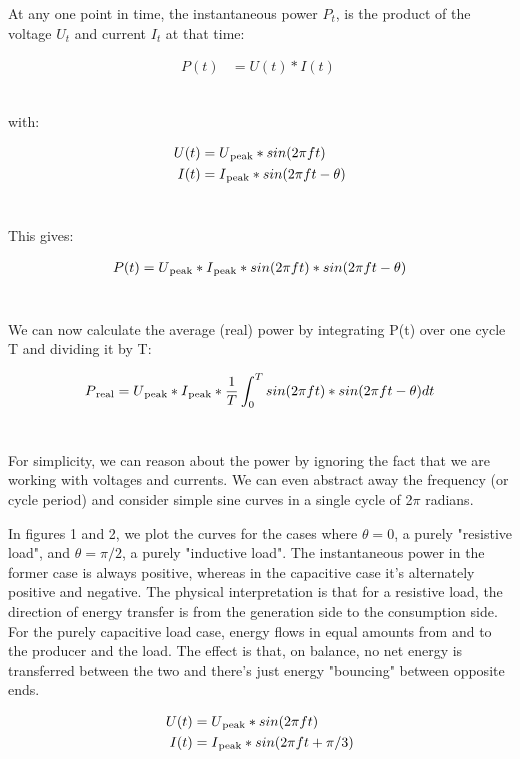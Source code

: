 \documentclass[a4paper]{article}
\def\SB#1{\textsubscript{{#1}}}
\begin{document}
At any one point in time, the instantaneous power $P_t$, is the product of
the voltage $U_t$ and current $I_t$ at that time:

\begin{align*}
  P(t) &= U(t) * I(t)\
\end{align*}\

 with:

 \begin{align*}
  U(t) &= U\SB{peak} * sin(2\pi ft)\\
  I(t) &= I\SB{peak} * sin(2\pi ft - \theta)\\
\end{align*}\

This gives:

\begin{align*}
  P(t) &= U\SB{peak} * I\SB{peak} * sin(2\pi ft) * sin(2\pi ft - \theta)\\
\end{align*}\

We can now calculate the average (real) power by integrating P(t) over
one cycle T and dividing it by T:

\begin{align*}
  P\SB{real} &= U\SB{peak} * I\SB{peak} * \frac{1}{T} \int_0^{T}{sin(2\pi ft) * sin(2\pi ft - \theta)} dt\\
\end{align*}\

For simplicity, we can reason about the power by ignoring the fact that we
are working with voltages and currents. We can even abstract away the
frequency (or cycle period) and consider simple sine curves in a single
cycle of 2$\pi$ radians.

In figures 1 and 2, we plot the curves for the cases where $\theta = 0$,
a purely "resistive load", and $\theta = \pi / 2$, a purely "inductive
load". The instantaneous power in the former case is always positive,
whereas in the capacitive case it's alternately positive and negative.
The physical interpretation is that for a resistive load, the direction of
energy transfer is from the generation side to the consumption side. For
the purely capacitive load case, energy flows in equal amounts from and
to the producer and the load. The effect is that, on balance, no net energy
is transferred between the two and there's just energy "bouncing" between
opposite ends.

\begin{align*}
  U(t) &= U\SB{peak}  * sin(2\pi ft)\\
  I(t) &= I\SB{peak} * sin(2\pi ft + \pi/3)
\end{align*}\
\end{document}
